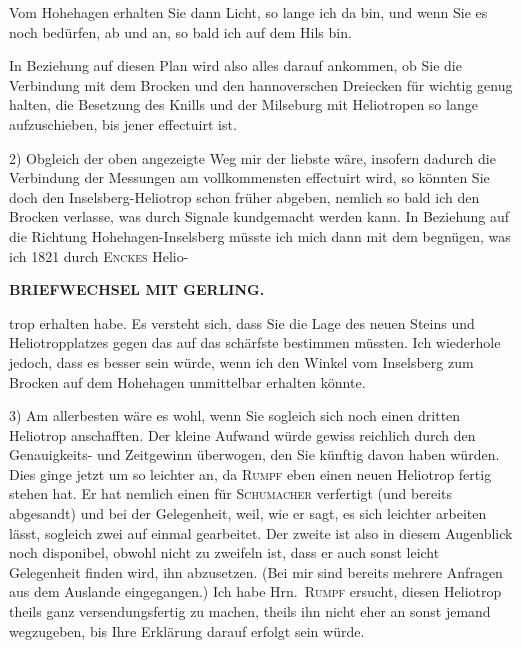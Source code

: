 Vom Hohehagen erhalten Sie dann  Licht, so lange ich da bin, und wenn Sie es noch bedürfen, ab und an, so bald ich auf dem Hils bin.
\par\noindent\hspace*{\parindent}In Beziehung auf diesen Plan wird also alles darauf ankommen, ob Sie die Verbindung mit dem Brocken und den hannoverschen Dreiecken für wichtig genug halten, die Besetzung des Knills und der Milseburg mit Heliotropen so lange aufzuschieben, bis jener effectuirt ist.
\par\noindent\hspace*{\parindent}2) Obgleich der oben angezeigte Weg mir der liebste wäre, insofern dadurch die Verbindung der Messungen am vollkommensten effectuirt wird, so könnten Sie doch den Inselsberg-Heliotrop  schon früher abgeben, nemlich so bald ich den Brocken verlasse, was durch Signale kundgemacht werden kann.
In Beziehung auf die Richtung Hohehagen-Inselsberg müsste ich mich dann mit dem begnügen, was ich 1821 durch \textsc{Enckes} Helio-
\par\clearpage
\noindent{}\hfill{\small\textbf{BRIEFWECHSEL MIT GERLING.}}\hfill\null\par\medskip
\noindent trop erhalten habe.
Es versteht sich, dass Sie die Lage des neuen Steins und Heliotropplatzes gegen das  auf das schärfste bestimmen müssten.
Ich wiederhole jedoch, dass es besser sein würde, wenn ich den Winkel vom Inselsberg zum Brocken auf dem Hohehagen unmittelbar erhalten könnte.
\par\noindent\hspace*{\parindent}3) Am allerbesten wäre es wohl, wenn Sie sogleich sich noch einen dritten Heliotrop anschafften.
Der kleine Aufwand würde gewiss reichlich durch den Genauigkeits- und Zeitgewinn überwogen, den Sie künftig davon haben würden.
Dies ginge jetzt um so leichter an, da \textsc{Rumpf} eben einen neuen Heliotrop fertig stehen hat.
Er hat nemlich einen für \textsc{Schumacher} verfertigt (und bereits abgesandt) und bei der Gelegenheit, weil, wie er sagt, es sich leichter arbeiten lässt, sogleich zwei auf einmal gearbeitet.
Der zweite ist also in diesem Augenblick noch disponibel, obwohl nicht zu zweifeln ist, dass er auch sonst leicht Gelegenheit finden wird, ihn abzusetzen.
(Bei mir sind bereits mehrere Anfragen aus dem Auslande eingegangen.)
Ich habe Hrn.~\textsc{Rumpf} ersucht, diesen Heliotrop theils ganz versendungsfertig zu machen, theils ihn nicht eher an sonst jemand wegzugeben, bis Ihre Erklärung darauf erfolgt sein würde.
